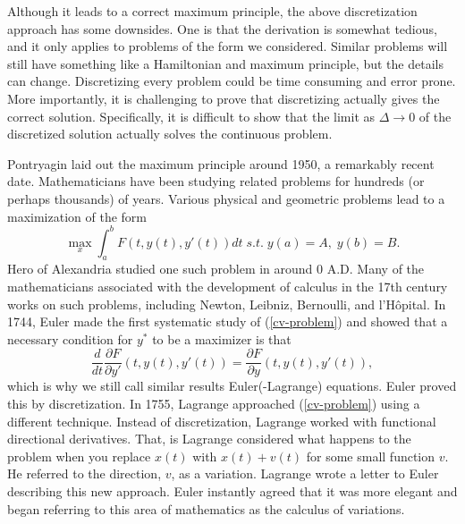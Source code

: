 Although it leads to a correct maximum principle, the above
discretization approach has some downsides. One is that the derivation
is somewhat tedious, and it only applies to problems of the form we
considered. Similar problems will still have something like a
Hamiltonian and maximum principle, but the details can
change. Discretizing every problem could be time consuming and error
prone. More importantly, it is challenging to prove that discretizing
actually gives the correct solution. Specifically, it is difficult to
show that the limit as $\Delta \to 0$ of the discretized solution
actually solves the continuous problem. 

\begin{history}
  Pontryagin laid out the maximum principle around 1950, a remarkably
  recent date. Mathematicians have been studying related
  problems for hundreds (or perhaps thousands) of years. Various
  physical and geometric problems lead to a maximization of the form
  \begin{equation} \max_x \int_a^b F(t,y(t),y'(t)) dt \; s.t. \; y(a) =A,\;
    y(b)=B \label{cv-problem}.
  \end{equation}
  Hero of Alexandria studied one such problem in around 0 A.D. Many of
  the mathematicians associated with the development of calculus in
  the 17th century works on such problems, including Newton, Leibniz,
  Bernoulli, and l'H\^{o}pital.  In 1744, Euler made the first
  systematic study of (\ref{cv-problem}) and showed that a necessary
  condition for $y^*$ to be a maximizer is that
  \[ \frac{d}{dt} \frac{\partial F}{\partial y'}(t,y(t),y'(t)) =
    \frac{\partial F}{\partial y}(t,y(t),y'(t)), \] which is why we
  still call similar results Euler(-Lagrange) equations. Euler proved
  this by discretization. In 1755, Lagrange approached
  (\ref{cv-problem}) using a different technique. Instead of
  discretization, Lagrange worked with functional directional
  derivatives. That, is Lagrange considered what happens to the
  problem when you replace $x(t)$ with $x(t) + v(t)$ for some small
  function $v$. He referred to the direction, $v$, as a
  variation. Lagrange wrote a letter to Euler describing this new
  approach. Euler instantly agreed that it was more elegant and began
  referring to this area of mathematics as the calculus of
  variations. 


\end{history}
